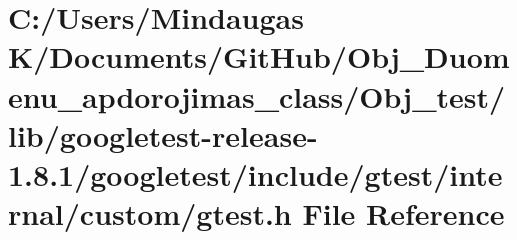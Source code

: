 \hypertarget{_obj__test_2lib_2googletest-release-1_88_81_2googletest_2include_2gtest_2internal_2custom_2gtest_8h}{}\section{C\+:/\+Users/\+Mindaugas K/\+Documents/\+Git\+Hub/\+Obj\+\_\+\+Duomenu\+\_\+apdorojimas\+\_\+class/\+Obj\+\_\+test/lib/googletest-\/release-\/1.8.1/googletest/include/gtest/internal/custom/gtest.h File Reference}
\label{_obj__test_2lib_2googletest-release-1_88_81_2googletest_2include_2gtest_2internal_2custom_2gtest_8h}
